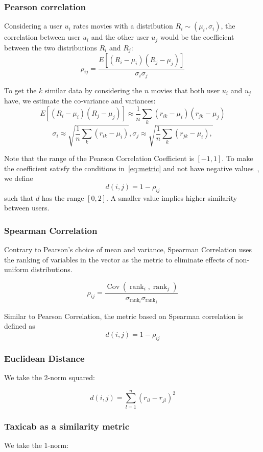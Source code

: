 \documentclass[final]{cvpr}
\begin{document}
\subsubsection{Pearson correlation}
Considering a user $u_i$ rates movies with a distribution $R_i \sim (\mu_i,\sigma_i)$,
the correlation between user $u_i$ and the other user $u_j$
would be the coefficient between the two distributions $R_i$ and $R_j$:
$$ \rho_{ij} = \frac{E[(R_i - \mu_i)(R_j - \mu_j)]}{\sigma_i \sigma_j} $$

To get the $k$ similar data by considering the $n$ movies that both user $u_i$ and $u_j$ have, we estimate the co-variance and variances:
$$ E[(R_i-\mu_i)(R_j-\mu_j)] \approx \frac{1}{n} \sum_k (r_{ik} - \mu_i) (r_{jk} - \mu_j)$$
$$ \sigma_i \approx \sqrt{\frac{1}{n} \sum_k (r_{ik} - \mu_i)} ,
 \sigma_j \approx \sqrt{\frac{1}{n} \sum_k (r_{jk} - \mu_i) ,}$$

Note that the range of the Pearson Correlation Coefficient is $[-1,1]$.
To make the coefficient satisfy the conditions in~\ref{eq:metric}
and not have negative values~\cite{Alpher01}, we define $$ d(i, j) = 1 - \rho_{ij} $$
such that $d$ has the range $[0, 2]$.
A smaller value implies higher similarity between users.

\subsubsection{Spearman Correlation}
Contrary to Pearson's choice of mean and variance,
Spearman Correlation uses the ranking of variables in the vector as the metric
to eliminate effects of non-uniform distributions.

$$ \rho_{ij} = \frac{
	\operatorname{Cov}({\operatorname{rank}_i, \operatorname{rank}_j})
}{
	\sigma_{\operatorname{rank}_i} \sigma_{\operatorname{rank}_j}
} $$

Similar to Pearson Correlation, the metric based on Spearman correlation is defined as
$$ d(i, j) = 1 - \rho_{ij} $$

\subsubsection{Euclidean Distance}
We take the $2$-norm squared:

$$ d(i, j) = \sum_{l=1}^n \left( r_{il} - r_{jl} \right)^2 $$

\subsubsection{Taxicab as a similarity metric}
We take the $1$-norm:
\end{document}
